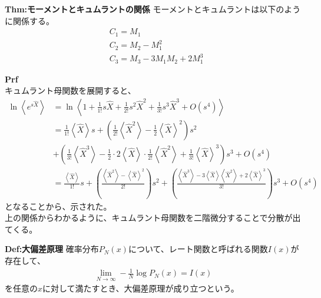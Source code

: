 \documentclass[a4paper,11pt]{jsarticle}
\numberwithin{equation}{section}
\begin{document}
\begin{itembox}[l]{\textbf{Thm:モーメントとキュムラントの関係}}
  モーメントとキュムラントは以下のように関係する。
  \begin{align}
    &C_1 = M_1\\
    &C_2 = M_2 - M_1^2\label{eq:cumulant2}\\
    &C_3 = M_3 - 3M_1M_2 + 2M_1^3
  \end{align}
\end{itembox}
\textbf{Prf}\\
キュムラント母関数を展開すると、
\begin{align}
  \ln \left\langle e^{s\hat{X}} \right\rangle &= \ln \left\langle 1 + \frac{1}{1!}s\hat{X} + \frac{1}{2!}s^2\hat{X}^2 + \frac{1}{3!}s^3\hat{X}^3 + O(s^4) \right\rangle \nonumber \\
  &= \frac{1}{1!} \left\langle \hat{X} \right\rangle s + \left( \frac{1}{2!} \left\langle \hat{X}^2 \right\rangle - \frac{1}{2} \left\langle \hat{X} \right\rangle^2 \right) s^2 \\
  &+ \left( \frac{1}{3!} \left\langle \hat{X}^3 \right\rangle - \frac{1}{2} \cdot 2 \left\langle \hat{X} \right\rangle \cdot \frac{1}{2!} \left\langle \hat{X}^2 \right\rangle + \frac{1}{3!} \left\langle \hat{X} \right\rangle^3 \right) s^3 + O(s^4) \nonumber \\
  &= \frac{\left\langle \hat{X} \right\rangle}{1!} s + \left( \frac{\left\langle \hat{X}^2 \right\rangle - \left\langle \hat{X} \right\rangle^2}{2!} \right) s^2 + \left( \frac{\left\langle \hat{X}^3 \right\rangle - 3 \left\langle \hat{X} \right\rangle \left\langle \hat{X}^2 \right\rangle + 2 \left\langle \hat{X} \right\rangle^3}{3!} \right) s^3 + O(s^4)
\end{align}
となることから、示された。\hfill\qedsymbol\\

上の関係からわかるように、キュムラント母関数を二階微分することで分散が出てくる。

\begin{itembox}[l]{\textbf{Def:大偏差原理}}
  確率分布$P_N(x)$について、レート関数と呼ばれる関数$I(x)$が存在して、
  \begin{align}
    \lim_{N \to \infty} -\frac{1}{N} \log P_N(x) = I(x)
  \end{align}
  を任意の$x$に対して満たすとき、大偏差原理が成り立つという。
\end{itembox}
\end{document}
